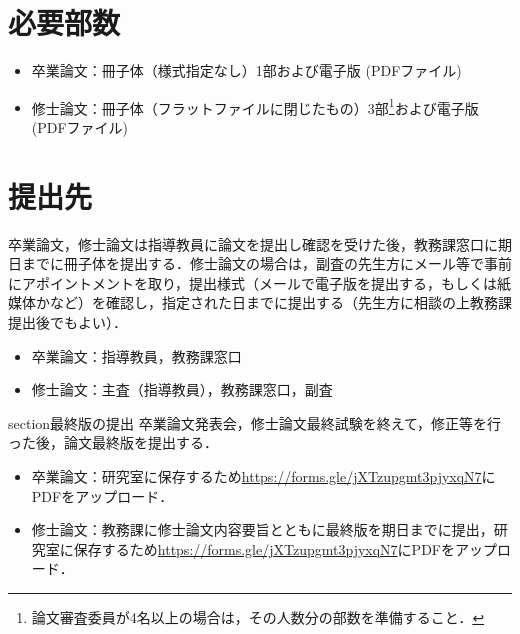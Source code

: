 

    \section{必要部数}
        \begin{itemize}
            \item 卒業論文：冊子体（様式指定なし）1部および電子版 (PDFファイル)
            \item 修士論文：冊子体（フラットファイルに閉じたもの）3部\footnote{論文審査委員が4名以上の場合は，その人数分の部数を準備すること．}および電子版 (PDFファイル)
        \end{itemize}

    \section{提出先}
    卒業論文，修士論文は指導教員に論文を提出し確認を受けた後，教務課窓口に期日までに冊子体を提出する．修士論文の場合は，副査の先生方にメール等で事前にアポイントメントを取り，提出様式（メールで電子版を提出する，もしくは紙媒体かなど）を確認し，指定された日までに提出する（先生方に相談の上教務課提出後でもよい）．
        \begin{itemize}
            \item 卒業論文：指導教員，教務課窓口
            \item 修士論文：主査（指導教員），教務課窓口，副査
        \end{itemize}

    section{最終版の提出}
    卒業論文発表会，修士論文最終試験を終えて，修正等を行った後，論文最終版を提出する．
        \begin{itemize}
            \item 卒業論文：研究室に保存するため\url{https://forms.gle/jXTzupgmt3pjyxqN7}にPDFをアップロード．
            \item 修士論文：教務課に修士論文内容要旨とともに最終版を期日までに提出，研究室に保存するため\url{https://forms.gle/jXTzupgmt3pjyxqN7}にPDFをアップロード．
        \end{itemize}
